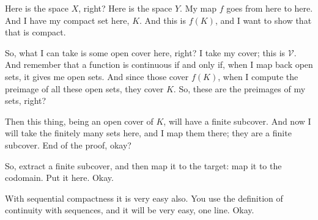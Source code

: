 \begin{speech}[00:32:15 - 00:34:26]
Here is the space $X$,  right? Here is the space $Y$.  My map $f$ goes from here to here.  And I have my compact set here,  $K$. And this is $f(K)$,  and I want to show that that is compact.

So, what I can take is some open cover here,  right? I take my cover; this is $\mathcal{V}$. And remember that a function is continuous if and only if, when I map back open sets, it gives me open sets. And since those cover $f(K)$, when I compute the preimage of all these open sets, they cover $K$.  So, these are the preimages of my sets, right?

Then this thing, being an open cover of $K$, will have a finite subcover. And now I will take the finitely many sets here, and I map them there; they are a finite subcover. End of the proof, okay?

So, extract a finite subcover,  and then map it to the target:  map it to the codomain.  Put it here. Okay.

With sequential compactness it is very easy also. You use the definition of continuity with sequences, and it will be very easy, one line. Okay.
\end{speech}


